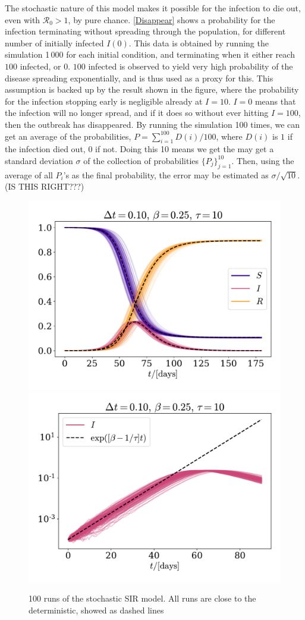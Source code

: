 \documentclass{article}
\begin{document}
    The stochastic nature of this model makes it possible for the infection to die out, even with $\mathcal{R}_0>1$, by pure chance. 
    \autoref{Disappear} shows a probability for the infection terminating without spreading through the population, for different number of initially infected $I(0)$.
    This data is obtained by running the simulation 1\,000 for each initial condition, and terminating when it either reach $100$ infected, or $0$.
    $100$ infected is observed to yield very high probability of the disease spreading exponentially, and is thus used as a proxy for this.
    This assumption is backed up by the result shown in the figure, where the probability for the infection stopping early is negligible already at $I=10$. 
    $I=0$ means that the infection will no longer spread, and if it does so without ever hitting $I=100$, then the outbreak has disappeared.
    By running the simulation 100 times, we can get an average of the probabilities, $P = \sum_{i=1}^{100} D(i)/100$, where $D(i)$ is $1$ if the infection died out, 0 if not.
    Doing this 10 means we get the may get a standard deviation $\sigma$ of the collection of probabilities $\{P_j\}_{j=1}^{10}$.
    Then, using the average of all $P_i$'s as the final probability, the error may be estimated as $\sigma/\sqrt{10}$. (IS THIS RIGHT???)

    \begin{figure}[H]
        \centering
        \includegraphics[width=.49\textwidth]{../plots/2B/TestSIR_stoch.pdf}
        \includegraphics[width=.49\textwidth]{../plots/2B/TestI_stoch.pdf}
        \caption{100 runs of the stochastic SIR model. All runs are close to the deterministic, showed as dashed lines}
        \label{stochastic SIR}
    \end{figure}
\end{document}
